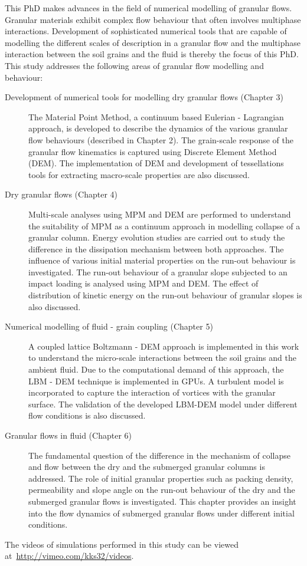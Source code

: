 This PhD makes advances in the field of numerical modelling of granular flows. 
Granular materials exhibit complex flow behaviour that often involves 
multiphase interactions. Development of sophisticated numerical tools that are 
capable of modelling the different scales of description in a granular flow and 
the multiphase interaction between the soil grains and the fluid is thereby the 
focus of this PhD. This study addresses the following 
areas of granular flow modelling and behaviour:
%
\begin{description}
\item[Development of numerical tools for modelling dry granular flows (Chapter 
3)]{The Material Point Method, a continuum based Eulerian - Lagrangian 
approach, is developed to describe the dynamics of the various granular flow 
behaviours (described in Chapter 2). The grain-scale response of the granular 
flow kinematics is captured using Discrete Element Method (DEM). The 
implementation of DEM and development of tessellations tools for extracting 
macro-scale properties are also discussed.}

\item[Dry granular flows (Chapter 4)] {Multi-scale analyses using MPM and DEM 
are performed to understand the suitability of MPM as a continuum approach in 
modelling collapse of a granular column. Energy evolution studies are carried 
out to study the difference in the dissipation mechanism between both 
approaches. The influence of various initial material properties on the run-out 
behaviour is investigated. The run-out behaviour of a granular slope subjected 
to an impact loading is analysed using MPM and DEM. The effect of distribution 
of kinetic energy on the run-out behaviour of granular slopes is also 
discussed.}

\item[Numerical modelling of fluid - grain coupling (Chapter 5)]{A coupled 
lattice Boltzmann - DEM approach is implemented in this work to understand the 
micro-scale interactions between the soil grains and the ambient fluid. Due to 
the computational demand of this approach, the LBM - DEM technique is 
implemented in GPUs. A turbulent model is incorporated to capture the
interaction of vortices with the granular surface. The validation of 
the developed LBM-DEM model under different flow conditions is also discussed.}

\item[Granular flows in fluid (Chapter 6)]{The fundamental question of the 
difference in the mechanism of collapse and flow between the dry and the 
submerged granular columns is addressed. The role of initial granular 
properties such as packing density, permeability and slope angle on the run-out 
behaviour of the dry and the submerged granular flows is investigated. This 
chapter provides an insight into the flow dynamics of submerged granular flows 
under different initial conditions.
}
\end{description}

The videos of simulations performed in this study can be viewed 
at~\url{http://vimeo.com/kks32/videos}. 